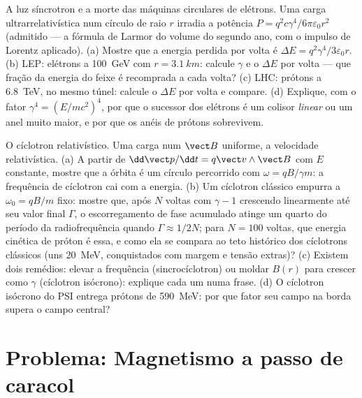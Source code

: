 \begin{exercise}[$\star\star\star$]\label{exo:b3:covariant-electromagnetism:11}
A luz síncrotron e a morte das máquinas circulares de elétrons. Uma
carga ultrarrelativística num círculo de raio $r$ irradia a potência
$P = q^2c\gamma^4/6\pi\varepsilon_0r^2$ (admitido --- a fórmula de
Larmor do volume do segundo ano, com o impulso de Lorentz aplicado).
(a) Mostre que a energia perdida por volta é
$\Delta E = q^2\gamma^4/3\varepsilon_0r$. (b) LEP: elétrons a
\qty{100}{GeV} com $r = \qty{3.1}{km}$: calcule $\gamma$ e o
$\Delta E$ por volta --- que fração da energia do feixe é recomprada a
cada volta? (c) LHC: prótons a \qty{6.8}{TeV}, no mesmo túnel: calcule
o $\Delta E$ por volta e compare. (d) Explique, com o fator $\gamma^4 =
(E/mc^2)^4$, por que o sucessor dos elétrons é um colisor
\emph{linear} ou um anel muito maior, e por que os anéis de prótons
sobrevivem.
\end{exercise}

\begin{exercise}[$\star\star\star$]\label{exo:b3:covariant-electromagnetism:12}
O cíclotron relativístico. Uma carga num $\vect B$ uniforme, a
velocidade relativística. (a) A partir de $\dd\vect p/\dd t = q\vect v\wedge\vect
B$ com $E$ constante, mostre que a órbita é um círculo percorrido com
$\omega = qB/\gamma m$: a frequência de cíclotron cai com a energia.
(b) Um cíclotron clássico empurra a $\omega_0 = qB/m$ fixo: mostre que,
após $N$ voltas com $\gamma - 1$ crescendo linearmente até seu valor
final $\Gamma$, o escorregamento de fase acumulado atinge um quarto do
período da radiofrequência quando $\Gamma \approx 1/2N$; para $N = 100$
voltas, que energia cinética de próton é essa, e como ela se compara ao
teto histórico dos cíclotrons clássicos (uns \qty{20}{MeV},
conquistados com margem e tensão extras)? (c) Existem dois remédios:
elevar a frequência (sincrocíclotron) ou moldar $B(r)$ para crescer
como $\gamma$ (cíclotron isócrono): explique cada um numa frase. (d) O
cíclotron isócrono do PSI entrega prótons de \qty{590}{MeV}: por que
fator seu campo na borda supera o campo central?
\end{exercise}

\section{Problema: Magnetismo a passo de caracol}

